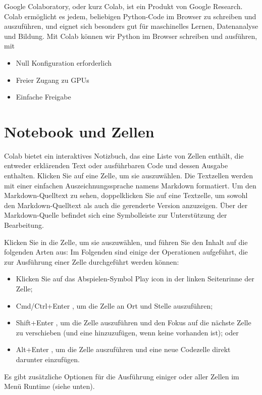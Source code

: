 Google Colaboratory, oder kurz \glqq Colab\grqq, ist ein Produkt von Google Research. Colab ermöglicht es jedem, beliebigen Python-Code im Browser zu schreiben und auszuführen, und eignet sich besonders gut für maschinelles Lernen, Datenanalyse und Bildung.
Mit Colab können wir Python im Browser schreiben und ausführen, mit

\begin{itemize}
	\item Null Konfiguration erforderlich
	\item Freier Zugang zu GPUs
	\item Einfache Freigabe
\end{itemize}

\section{Notebook und Zellen}

Colab bietet ein interaktives Notizbuch, das eine Liste von Zellen enthält, die entweder erklärenden Text oder ausführbaren Code und dessen Ausgabe enthalten. Klicken Sie auf eine Zelle, um sie auszuwählen.
Die Textzellen werden mit einer einfachen Auszeichnungssprache namens Markdown formatiert.
Um den Markdown-Quelltext zu sehen, doppelklicken Sie auf eine Textzelle, um sowohl den Markdown-Quelltext als auch die gerenderte Version anzuzeigen. Über der Markdown-Quelle befindet sich eine Symbolleiste zur Unterstützung der Bearbeitung.

Klicken Sie in die Zelle, um sie auszuwählen, und führen Sie den Inhalt auf die folgenden Arten aus:
Im Folgenden sind einige der Operationen aufgeführt, die zur Ausführung einer Zelle durchgeführt werden können: 

\begin{itemize}
	\item Klicken Sie auf das Abspielen-Symbol \glqq Play icon \grqq{} in der linken Seitenrinne der Zelle;
	\item \glqq Cmd/Ctrl+Enter\grqq{} , um die Zelle an Ort und Stelle auszuführen;
	\item \glqq Shift+Enter\grqq{} , um die Zelle auszuführen und den Fokus auf die nächste Zelle zu verschieben (und eine hinzuzufügen, wenn keine vorhanden ist); oder
	\item \glqq Alt+Enter\grqq{} , um die Zelle auszuführen und eine neue Codezelle direkt darunter einzufügen.
\end{itemize} 

Es gibt zusätzliche Optionen für die Ausführung einiger oder aller Zellen im Menü \glqq Runtime\grqq{} (siehe unten). 

